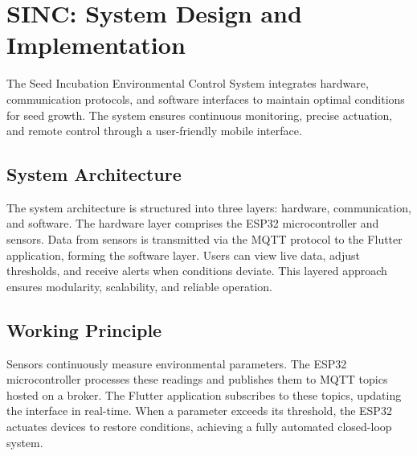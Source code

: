 \documentclass[../main]{subfiles}
\begin{document}

\chapter{SINC: System Design and Implementation}

The Seed Incubation Environmental Control System integrates hardware,
communication protocols, and software interfaces to maintain optimal conditions
for seed growth. The system ensures continuous monitoring, precise actuation,
and remote control through a user-friendly mobile interface.

\section{System Architecture}

The system architecture is structured into three layers: hardware,
communication, and software. The hardware layer comprises the ESP32
microcontroller and sensors. Data from sensors is transmitted via the MQTT
protocol to the Flutter application, forming the software layer. Users can view
live data, adjust thresholds, and receive alerts when conditions deviate. This
layered approach ensures modularity, scalability, and reliable operation.

\section{Working Principle}

Sensors continuously measure environmental parameters. The ESP32
microcontroller processes these readings and publishes them to MQTT topics
hosted on a broker. The Flutter application subscribes to these topics,
updating the interface in real-time. When a parameter exceeds its threshold,
the ESP32 actuates devices to restore conditions, achieving a fully automated
closed-loop system.
\end{document}
